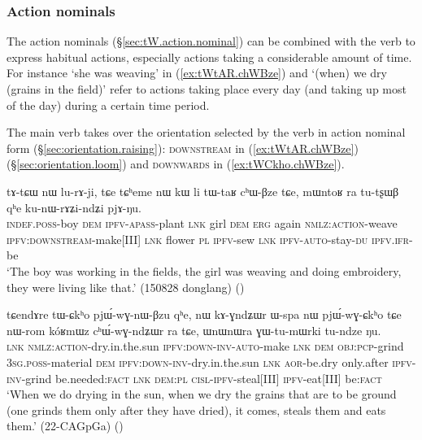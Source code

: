 \subsubsection{Action nominals} \label{sec:action.nominal.Bzu}
The  action nominals (§\ref{sec:tW.action.nominal}) can be combined with the verb  to express habitual actions, especially actions taking a considerable amount of time. For instance  `she was weaving' in (\ref{ex:tWtAR.chWBze}) and  `(when) we dry (grains in the field)' refer to actions taking place every day (and taking up most of the day) during a certain time period.  

The main verb  takes over the orientation selected by the verb in action nominal form (§\ref{sec:orientation.raising}): \textsc{downstream} in (\ref{ex:tWtAR.chWBze}) (§\ref{sec:orientation.loom}) and \textsc{downwards} in (\ref{ex:tWCkho.chWBze}).

\begin{exe}
	\ex \label{ex:tWtAR.chWBze}
	\gll tɤ-tɕɯ nɯ lu-rɤ-ji,  tɕe tɕʰeme nɯ kɯ li tɯ-taʁ cʰɯ-βze tɕe, mɯntoʁ ra tu-tʂɯβ qʰe ku-nɯ-rɤʑi-ndʑi pjɤ-ŋu.  \\
	\textsc{indef}.\textsc{poss}-boy \textsc{dem} \textsc{ipfv}-\textsc{apass}-plant \textsc{lnk} girl \textsc{dem} \textsc{erg} again \textsc{nmlz}:\textsc{action}-weave \textsc{ipfv}:\textsc{downstream}-make[III] \textsc{lnk} flower \textsc{pl} \textsc{ipfv}-sew \textsc{lnk} \textsc{ipfv}-\textsc{auto}-stay-\textsc{du} \textsc{ipfv}.\textsc{ifr}-be \\
	\glt `The boy was working in the fields, the girl was weaving and doing embroidery, they were living like that.' (150828 donglang)
()
\end{exe}


\begin{exe}
	\ex \label{ex:tWCkho.chWBze}
	\gll tɕendɤre tɯ-ɕkʰo pjɯ́-wɣ-nɯ-βzu qʰe, nɯ kɤ-ɣndʑɯr ɯ-spa nɯ pjɯ́-wɣ-ɕkʰo tɕe nɯ-rom kóʁmɯz cʰɯ́-wɣ-ndʑɯr ra tɕe, ɯnɯnɯra ɣɯ-tu-mɯrki tu-ndze ŋu. \\
	\textsc{lnk} \textsc{nmlz}:\textsc{action}-dry.in.the.sun \textsc{ipfv}:\textsc{down}-\textsc{inv}-\textsc{auto}-make \textsc{lnk} \textsc{dem} \textsc{obj}:\textsc{pcp}-grind \textsc{3sg}.\textsc{poss}-material \textsc{dem} \textsc{ipfv}:\textsc{down}-\textsc{inv}-dry.in.the.sun \textsc{lnk} \textsc{aor}-be.dry only.after \textsc{ipfv}-\textsc{inv}-grind be.needed:\textsc{fact} \textsc{lnk} \textsc{dem}:\textsc{pl} \textsc{cisl}-\textsc{ipfv}-steal[III] \textsc{ipfv}-eat[III] be:\textsc{fact} \\
	\glt `When we do drying in the sun, when we dry the grains that are to be ground (one grinds them only after they have dried), it comes, steals them and eats them.' (22-CAGpGa)
()
\end{exe}

